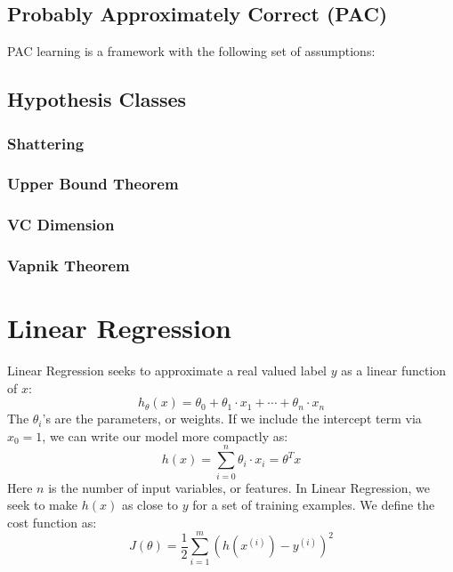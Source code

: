 \documentclass[twoside,twocolumn]{article}
\begin{document}
\subsection{Probably Approximately Correct (PAC)}
PAC learning is a framework with the following set of assumptions:
\subsection{Hypothesis Classes}
\subsubsection{Shattering}
\subsubsection{Upper Bound Theorem}
\subsubsection{VC Dimension}
\subsubsection{Vapnik Theorem}
\section{Linear Regression}
Linear Regression seeks to approximate a real valued label $y$ as a
linear function of $x$:
\begin{equation}
  h_{\theta}(x) = \theta_0 + \theta_1 \cdot x_1 + \cdots + \theta_n \cdot x_n
\end{equation}
The $\theta_i$'s are the parameters, or weights. If we include the
intercept term via $x_0=1$, we can write our model more compactly as:
\begin{equation}
  h(x) = \sum_{i=0}^{n} \theta_i \cdot x_i = \theta^T x
\end{equation}
Here $n$ is the number of input variables, or features. In Linear Regression,
we seek to make $h(x)$ as close to $y$ for a set of training examples. We
define the cost function as:
\begin{equation}
  J(\theta) = \frac{1}{2} \sum_{i=1}^{m} \left( h \left(x^{(i)}\right) - y^{(i)}\right)^2
\end{equation}
\end{document}
